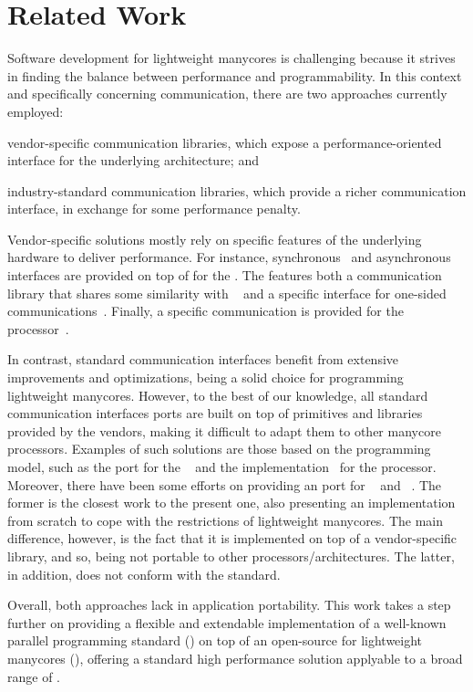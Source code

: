 \section{Related Work}
\label{sec:related-work}

	Software development for lightweight manycores is challenging
	because it strives in finding the balance between performance and
	programmability. In this context and specifically concerning
	communication, there are two approaches currently employed:
	\begin{enumerate*}[label=(\roman*)]
		\item vendor-specific communication libraries, which expose a
			performance-oriented interface for the underlying
			architecture; and 

		\item industry-standard communication libraries, which provide a
			richer communication interface, in exchange for some
			performance penalty.
	\end{enumerate*}

	Vendor-specific solutions mostly rely on specific features of the
	underlying hardware to deliver performance. For instance,
	synchronous~\cite{Wijngaart2011} and asynchronous~\cite{Clauss2011}
	interfaces are provided on top of \mpb for the \scc. The \mppa features
	both a communication library that shares some similarity
	with \posix~\cite{Dinechin2013-1} and a specific interface for one-sided
	communications~\cite{Hascoet2017}.
	Finally, a specific communication \api is provided for the \epiphany
	processor~\cite{Varghese2014}.

	In contrast, standard communication interfaces benefit from
	extensive improvements and optimizations, being a solid choice
	for programming lightweight manycores. However, to the best of our
	knowledge, all standard communication interfaces ports are built on
	top of primitives and libraries provided by the vendors,
	making it difficult to adapt them to other
	manycore processors. Examples of such solutions are those based on
	the \pgas programming model, such as the \upc port for the
	\scc~\cite{Gamell2012} and the \openshmem implementation~\cite{Ross2016}
	for the \epiphany processor.  Moreover, there have been some efforts on
	providing an \mpi port for \mppa~\cite{Quan2015} and
	\epiphany~\cite{Richie2017}. The former is the closest work to the
	present one, also presenting an implementation from scratch to cope
	with the restrictions of lightweight manycores. The main difference,
	however, is the fact that it is implemented on top of a
	vendor-specific \ipc library, and so, being not portable to other
	processors/architectures. The latter, in addition, does not conform
	with the \mpi standard.

	Overall, both approaches lack in application
	portability. This work takes a step further on providing a
	flexible and extendable implementation of a well-known parallel
	programming standard (\mpi) on top of an open-source \os for
	lightweight manycores (\nanvix), offering a standard high
	performance solution applyable to a broad range of \lws.
